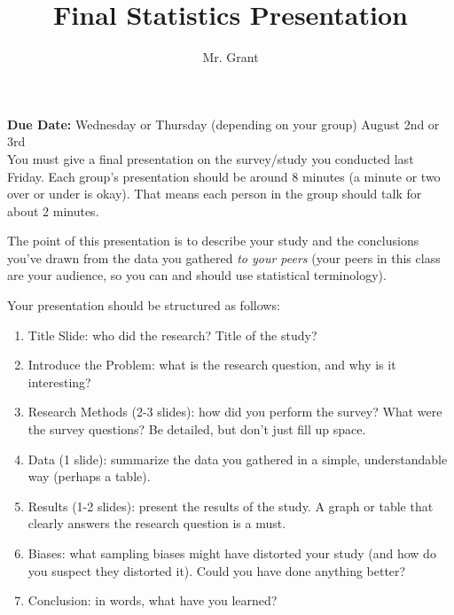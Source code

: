 \documentclass[12pt]{article}
\begin{document}
\title{Final Statistics Presentation}
\author{Mr. Grant}
\maketitle

\textbf{Due Date:} Wednesday or Thursday (depending on your group) August 2nd or 3rd \\

You must give a final presentation on the survey/study you conducted last Friday. Each group's presentation should be around 8 minutes (a minute or two over or under is okay). That means each person in the group should talk for about 2 minutes.

The point of this presentation is to describe your study and the conclusions you've drawn from the data you gathered \textit{to your peers} (your peers in this class are your audience, so you can and should use statistical terminology).

Your presentation should be structured as follows:
\begin{enumerate}
	\item Title Slide: who did the research? Title of the study?
	\item Introduce the Problem: what is the research question, and why is it interesting?
	\item Research Methods (2-3 slides): how did you perform the survey? What were the survey questions? Be detailed, but don't just fill up space.
	\item Data (1 slide): summarize the data you gathered in a simple, understandable way (perhaps a table).
	\item Results (1-2 slides): present the results of the study. A graph or table that clearly answers the research question is a must.
	\item Biases: what sampling biases might have distorted your study (and how do you suspect they distorted it). Could you have done anything better?
	\item Conclusion: in words, what have you learned?
\end{enumerate}
\end{document}
